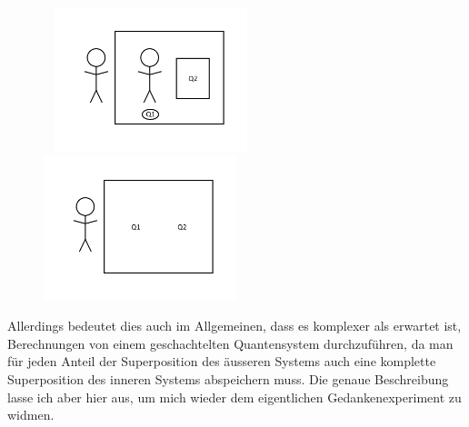 \documentclass[a4paper]{article}
\begin{document}
\begin{figure}[!htb]
\begin{floatrow}[2]\
%
{\includegraphics[width=0.5\textwidth]{a.png}}
%
%
{\includegraphics[width=0.5\textwidth]{b.png}}
\end{floatrow}
\end{figure}
Allerdings bedeutet dies auch im Allgemeinen, dass es komplexer als erwartet ist, Berechnungen von einem geschachtelten Quantensystem durchzuführen, da man für jeden Anteil der Superposition des äusseren Systems auch eine komplette Superposition des inneren Systems abspeichern muss. Die genaue Beschreibung lasse ich aber hier aus, um mich wieder dem eigentlichen Gedankenexperiment zu widmen.
\end{document}
